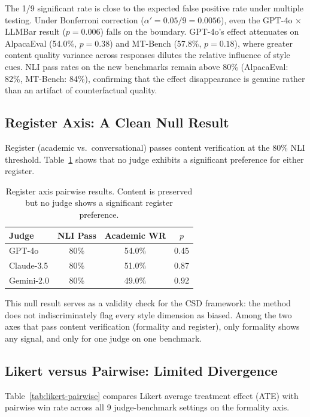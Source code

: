 \documentclass[11pt,a4paper]{article}
\begin{document}
The 1/9 significant rate is close to the expected false positive rate under multiple testing.
Under Bonferroni correction ($\alpha' = 0.05/9 = 0.0056$), even the GPT-4o $\times$ LLMBar result ($p=0.006$) falls on the boundary.
GPT-4o's effect attenuates on AlpacaEval (54.0\%, $p=0.38$) and MT-Bench (57.8\%, $p=0.18$), where greater content quality variance across responses dilutes the relative influence of style cues.
NLI pass rates on the new benchmarks remain above 80\% (AlpacaEval: 82\%, MT-Bench: 84\%), confirming that the effect disappearance is genuine rather than an artifact of counterfactual quality.

\subsection{Register Axis: A Clean Null Result}
\label{sec:register}

Register (academic vs.\ conversational) passes content verification at the 80\% NLI threshold.
Table~\ref{tab:register} shows that no judge exhibits a significant preference for either register.

\begin{table}[t]
\centering
\caption{Register axis pairwise results. Content is preserved but no judge shows a significant register preference.}
\label{tab:register}
\small
\begin{tabular}{lccc}
\toprule
\textbf{Judge} & \textbf{NLI Pass} & \textbf{Academic WR} & \textbf{$p$} \\
\midrule
GPT-4o & 80\% & 54.0\% & 0.45 \\
Claude-3.5 & 80\% & 51.0\% & 0.87 \\
Gemini-2.0 & 80\% & 49.0\% & 0.92 \\
\bottomrule
\end{tabular}
\end{table}

This null result serves as a validity check for the CSD framework: the method does not indiscriminately flag every style dimension as biased.
Among the two axes that pass content verification (formality and register), only formality shows any signal, and only for one judge on one benchmark.

\subsection{Likert versus Pairwise: Limited Divergence}
\label{sec:likert-pairwise}

Table~\ref{tab:likert-pairwise} compares Likert average treatment effect (ATE) with pairwise win rate across all 9 judge-benchmark settings on the formality axis.
\end{document}
